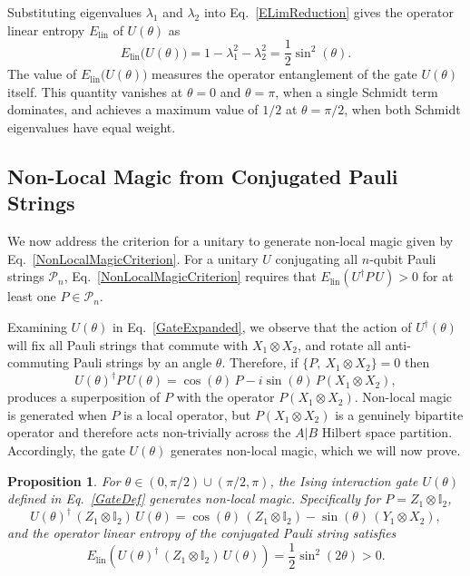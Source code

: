 \documentclass[12pt,a4paper]{article}
\newtheorem{proposition}{Proposition}
\begin{document}
Substituting eigenvalues $\lambda_1$ and $\lambda_2$ into Eq.\ \eqref{ELimReduction} gives the operator linear entropy $E_{\mathrm{lin}}$ of $U(\theta)$ as
%
\begin{equation}\label{ElinU}
E_{\mathrm{lin}}\bigl(U(\theta)\bigr) = 1 - \lambda_1^2 - \lambda_2^2 = \frac{1}{2}\sin^2(\theta).
\end{equation}
%
The value of $E_{\mathrm{lin}}\bigl(U(\theta)\bigr)$ measures the operator entanglement of the gate $U(\theta)$ itself. This quantity vanishes at $\theta = 0$ and $\theta = \pi$, when a single Schmidt term dominates, and achieves a maximum value of $1/2$ at $\theta = \pi/2$, when both Schmidt eigenvalues have equal weight.

\subsection{Non-Local Magic from Conjugated Pauli Strings}\label{subsec:nonlocal_magic}

We now address the criterion for a unitary to generate non-local magic given by Eq.\ \eqref{NonLocalMagicCriterion}. For a unitary $U$ conjugating all $n$-qubit Pauli strings $\mathcal{P}_n$, Eq.\ \eqref{NonLocalMagicCriterion} requires that $E_{\mathrm{lin}}(U^\dagger P\,U) > 0$ for at least one $P \in \mathcal{P}_n$. 

Examining $U(\theta)$ in Eq.\ \eqref{GateExpanded}, we observe that the action of $U^{\dagger}(\theta)$ will fix all Pauli strings that commute with $X_1\otimes X_2$, and rotate all anti-commuting Pauli strings by an angle $\theta$. Therefore, if $\{P,\ X_1\otimes X_2\} = 0$ then 
%
\begin{equation}\label{PauliRotation}
    U(\theta)^\dagger P\, U(\theta) = \cos(\theta)\,P - i\sin(\theta)\,P(X_1\otimes X_2),
\end{equation}
%
produces a superposition of $P$ with the operator $P(X_1\otimes X_2)$. Non-local magic is generated when $P$ is a local operator, but $P(X_1\otimes X_2)$ is a genuinely bipartite operator and therefore acts non-trivially across the $A|B$ Hilbert space partition. Accordingly, the gate $U(\theta)$ generates non-local magic, which we will now prove.

\begin{proposition}\label{prop:nonlocal}
For $\theta \in (0,\pi/2)\cup(\pi/2,\pi)$, the Ising interaction gate $U(\theta)$ defined in Eq.\ \eqref{GateDef} generates non-local magic. Specifically for $P = Z_1\otimes\mathbb{I}_2$,
%
\begin{equation}\label{ConjugationResult}
U(\theta)^\dagger\,(Z_1\otimes\mathbb{I}_2)\,U(\theta) = \cos(\theta)\,(Z_1\otimes\mathbb{I}_2) - \sin(\theta)\,(Y_1\otimes X_2),
\end{equation}
%
and the operator linear entropy of the conjugated Pauli string satisfies
%
\begin{equation}\label{ElinResult}
E_{\mathrm{lin}}\left(U(\theta)^\dagger\,(Z_1\otimes\mathbb{I}_2)\,U(\theta)\right) = \frac{1}{2}\sin^2(2\theta) > 0.
\end{equation}
%
\end{proposition}
\end{document}
